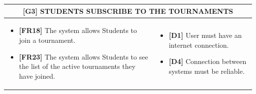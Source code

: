 \documentclass{article}
\begin{document}
\begin{table}
\begin{adjustwidth}{-1in}{-1in}
 \renewcommand{\arraystretch}{1.5}
    \begin{tabular}{|p{9.5cm}|p{9.5cm}|}
        \hline
        \multicolumn{2}{|c|}{\textbf{[G3] STUDENTS SUBSCRIBE TO THE TOURNAMENTS}} \\
        \hline
        \begin{itemize}[label={}, left=0pt, align=left, itemsep=5pt]
            \item \textbf{[FR18]} The system allows Students to join a tournament.
            \item \textbf{[FR23]} The system allows Students to see the list of the active tournaments they have joined.
        \end{itemize} &
        \begin{itemize}[label={}, left=0pt, align=left, itemsep=5pt]
            \item \textbf{[D1]} User must have an internet connection.
            \item \textbf{[D4]} Connection between systems must be reliable.
        \end{itemize} \\
        \hline
    \end{tabular}
\end{adjustwidth}
\end{table}
\end{document}
